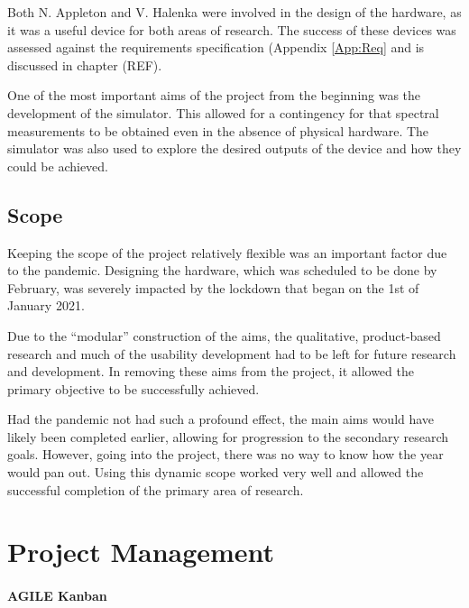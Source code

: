 Both N. Appleton and V. Halenka were involved in the design of the hardware, as it was a useful device for both areas of research. The success of these devices was assessed against the requirements specification (Appendix \ref{App:Req} and is discussed in chapter (REF).

One of the most important aims of the project from the beginning was the development of the simulator. This allowed for a contingency for that spectral measurements to be obtained even in the absence of physical hardware. The simulator was also used to explore the desired outputs of the device and how they could be achieved.

\subsection{Scope}

Keeping the scope of the project relatively flexible was an important factor due to the pandemic. Designing the hardware, which was scheduled to be done by February, was severely impacted by the lockdown that began on the 1st of January 2021. 

Due to the ``modular'' construction of the aims, the qualitative, product-based research and much of the usability development had to be left for future research and development. In removing these aims from the project, it allowed the primary objective to be successfully achieved.

Had the pandemic not had such a profound effect, the main aims would have likely been completed earlier, allowing for progression to the secondary research goals. However, going into the project, there was no way to know how the year would pan out. Using this dynamic scope worked very well and allowed the successful completion of the primary area of research. 



\section{Project Management}


\paragraph{AGILE Kanban}

